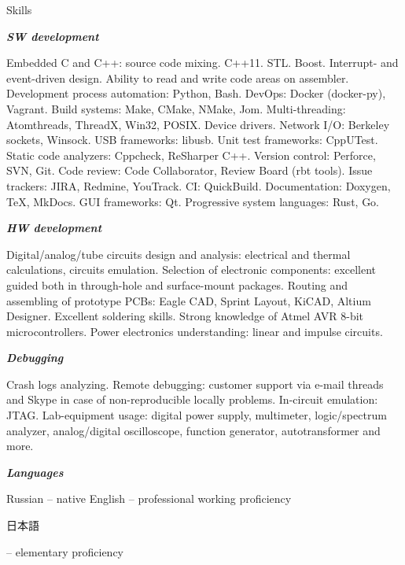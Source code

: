 \documentclass{template}
\begin{document}

\begin{rSection}{Skills}
\begin{rItemize}

\item \textbf{\textit{SW development}}

      Embedded C and C++: source code mixing. C++11. STL. Boost. Interrupt- and event-driven design. Ability to read and write code areas on
      assembler. Development process automation: Python, Bash. DevOps: Docker (docker-py), Vagrant. Build systems: Make, CMake, NMake, Jom.
      Multi-threading: Atomthreads, ThreadX, Win32, POSIX. Device drivers. Network I/O: Berkeley sockets, Winsock. USB frameworks: libusb. Unit
      test frameworks: CppUTest. Static code analyzers: Cppcheck, ReSharper C++. Version control: Perforce, SVN, Git. Code review: Code Collaborator,
      Review Board (rbt tools). Issue trackers: JIRA, Redmine, YouTrack. CI: QuickBuild. Documentation: Doxygen, \TeX, MkDocs. GUI frameworks: Qt.
      Progressive system languages: Rust, Go.

\item \textbf{\textit{HW development}}

      Digital/analog/tube circuits design and analysis: electrical and thermal calculations, circuits emulation. Selection of electronic components:
      excellent guided both in through-hole and surface-mount packages. Routing and assembling of prototype PCBs: Eagle CAD, Sprint Layout, KiCAD,
      Altium Designer. Excellent soldering skills. Strong knowledge of Atmel AVR 8-bit microcontrollers. Power electronics understanding: linear and
      impulse circuits.

\item \textbf{\textit{Debugging}}

      Crash logs analyzing. Remote debugging: customer support via e-mail threads and Skype in case of non-reproducible locally problems.
      In-circuit emulation: JTAG. Lab-equipment usage: digital power supply, multimeter, logic/spectrum analyzer, analog/digital oscilloscope,
      function generator, autotransformer and more.

\item \textbf{\textit{Languages}}

      Russian -- native \newline
      English -- professional working proficiency \newline
      \begin{CJK}{UTF8}{min}日本語\end{CJK} -- elementary proficiency


\end{rItemize}
\end{rSection}
\end{document}
